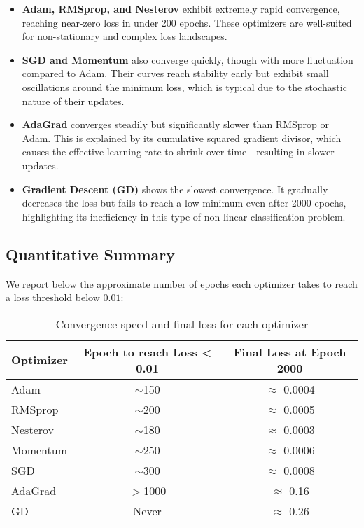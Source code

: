 \documentclass[12pt]{article}
\begin{document}
\begin{itemize}
    \item \textbf{Adam, RMSprop, and Nesterov} exhibit extremely rapid convergence, reaching near-zero loss in under 200 epochs. These optimizers are well-suited for non-stationary and complex loss landscapes.
    
    \item \textbf{SGD and Momentum} also converge quickly, though with more fluctuation compared to Adam. Their curves reach stability early but exhibit small oscillations around the minimum loss, which is typical due to the stochastic nature of their updates.
    
    \item \textbf{AdaGrad} converges steadily but significantly slower than RMSprop or Adam. This is explained by its cumulative squared gradient divisor, which causes the effective learning rate to shrink over time—resulting in slower updates.
    
    \item \textbf{Gradient Descent (GD)} shows the slowest convergence. It gradually decreases the loss but fails to reach a low minimum even after 2000 epochs, highlighting its inefficiency in this type of non-linear classification problem.
\end{itemize}

\subsection{Quantitative Summary}

We report below the approximate number of epochs each optimizer takes to reach a loss threshold below $0.01$:

\begin{table}[H]
\centering
\begin{tabular}{|l|c|c|}
\hline
\textbf{Optimizer} & \textbf{Epoch to reach Loss < 0.01} & \textbf{Final Loss at Epoch 2000} \\
\hline
Adam      & $\sim$150   & $\approx$ 0.0004 \\
RMSprop   & $\sim$200   & $\approx$ 0.0005 \\
Nesterov  & $\sim$180   & $\approx$ 0.0003 \\
Momentum  & $\sim$250   & $\approx$ 0.0006 \\
SGD       & $\sim$300   & $\approx$ 0.0008 \\
AdaGrad   & $>$1000     & $\approx$ 0.16 \\
GD        & Never       & $\approx$ 0.26 \\
\hline
\end{tabular}
\caption{Convergence speed and final loss for each optimizer}
\label{tab:loss-table}
\end{table}
\end{document}
